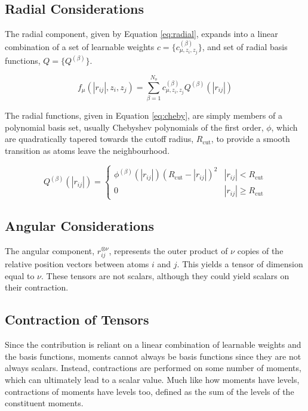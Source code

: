\documentclass[9pt,twocolumn,twoside]{opticajnl}
\begin{document}
\subsection{Radial Considerations}
The radial component, given by Equation \ref{eq:radial}, expands into a linear combination of a set of learnable weights $c = \{c^{(\beta)} _ {\mu,z_i,z_j} \}$, and set of radial basis functions, $Q = \{Q^{(\beta)}\}$.

\begin{equation} \label{eq:radial}
  f_\mu (|r_{ij}|,z_i,z_j) = \sum ^ {N_o} _ {\beta = 1} c^{(\beta)} _ {\mu,z_i,z_j}  Q^{(\beta)}(|r_{ij}|)
\end{equation}

The radial functions, given in Equation \ref{eq:cheby}, are simply members of a polynomial basis set, usually Chebyshev polynomials of the first order, $\phi$, which are quadratically tapered towards the cutoff radius, $R_{\textrm{cut}}$, to provide a smooth transition as atoms leave the neighbourhood.

\begin{equation} \label{eq:cheby}
  Q^{(\beta)}(|r_{ij}|)=  \begin{cases}
    \phi ^{(\beta)}(|r_{ij}|) (R_{\textrm{cut}} - |r_{ij}|)^2& |r_{ij}| < R_{\textrm{cut}} \\
    0 & |r_{ij}| \geq R_{\textrm{cut}} 
\end{cases}
\end{equation}

\subsection{Angular Considerations}
The angular component, $r_{ij} ^{\otimes \nu}$, represents the outer product of $\nu$ copies of the relative position vectors between atoms $i$ and $j$. This yields a tensor of dimension equal to $\nu$. These tensors are not scalars, although they could yield scalars on their contraction.

\subsection{Contraction of Tensors}
Since the contribution is reliant on a linear combination of learnable weights and the basis functions, moments cannot always be basis functions since they are not always scalars. Instead, contractions are performed on some number of moments, which can ultimately lead to a scalar value. Much like how moments have levels, contractions of moments have levels too, defined as the sum of the levels of the constituent moments.
\end{document}
